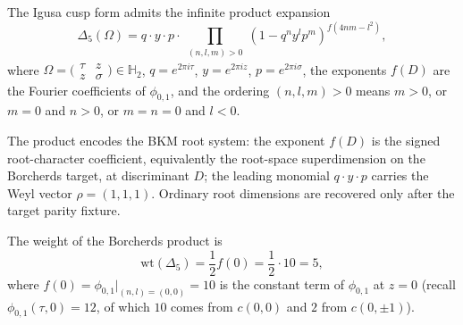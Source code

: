 \begin{theorem}
\label{thm:k3e-borcherds-product}
The Igusa cusp form admits the infinite product expansion
\[
 \Delta_5(\Omega) = q \cdot y \cdot p \cdot \prod_{\substack{(n,l,m) > 0}} (1 - q^n y^l p^m)^{f(4nm - l^2)},
\]
where $\Omega = \bigl(\begin{smallmatrix} \tau & z \\ z & \sigma \end{smallmatrix}\bigr) \in \mathbb{H}_2$, $q = e^{2\pi i \tau}$, $y = e^{2\pi i z}$, $p = e^{2\pi i \sigma}$, the exponents $f(D)$ are the Fourier coefficients of $\phi_{0,1}$, and the ordering $(n,l,m) > 0$ means $m > 0$, or $m = 0$ and $n > 0$, or $m = n = 0$ and $l < 0$.
\end{theorem}

The product encodes the BKM root system: the exponent $f(D)$ is the signed root-character coefficient, equivalently the root-space superdimension on the Borcherds target, at discriminant $D$; the leading monomial $q \cdot y \cdot p$ carries the Weyl vector $\rho = (1,1,1)$. Ordinary root dimensions are recovered only after the target parity fixture.

\begin{proposition}
\label{prop:k3e-weight-formula}
The weight of the Borcherds product is
\[
 \mathrm{wt}(\Delta_5) = \frac{1}{2} f(0) = \frac{1}{2} \cdot 10 = 5,
\]
where $f(0) = \phi_{0,1}|_{(n,l)=(0,0)} = 10$ is the constant term of $\phi_{0,1}$ at $z = 0$ (recall $\phi_{0,1}(\tau, 0) = 12$, of which $10$ comes from $c(0,0)$ and $2$ from $c(0, \pm 1)$).
\end{proposition}

